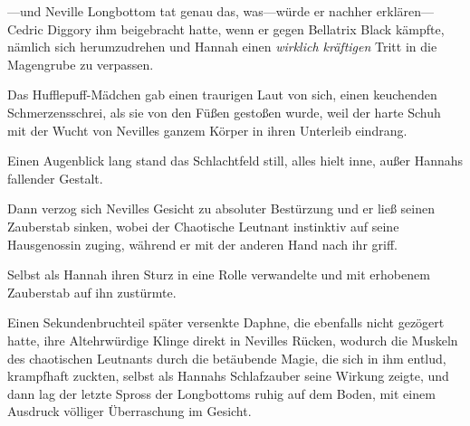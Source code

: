 —und Neville Longbottom tat genau das, was—würde er nachher erklären—Cedric Diggory ihm beigebracht hatte, wenn er gegen Bellatrix Black kämpfte, nämlich sich herumzudrehen und Hannah einen \emph{wirklich kräftigen} Tritt in die Magengrube zu verpassen.

Das Hufflepuff-Mädchen gab einen traurigen Laut von sich, einen keuchenden Schmerzensschrei, als sie von den Füßen gestoßen wurde, weil der harte Schuh mit der Wucht von Nevilles ganzem Körper in ihren Unterleib eindrang.

Einen Augenblick lang stand das Schlachtfeld still, alles hielt inne, außer Hannahs fallender Gestalt.

Dann verzog sich Nevilles Gesicht zu absoluter Bestürzung und er ließ seinen Zauberstab sinken, wobei der Chaotische Leutnant instinktiv auf seine Hausgenossin zuging, während er mit der anderen Hand nach ihr griff.

Selbst als Hannah ihren Sturz in eine Rolle verwandelte und mit erhobenem Zauberstab auf ihn zustürmte.

Einen Sekundenbruchteil später versenkte Daphne, die ebenfalls nicht gezögert hatte, ihre Altehrwürdige Klinge direkt in Nevilles Rücken, wodurch die Muskeln des chaotischen Leutnants durch die betäubende Magie, die sich in ihm entlud, krampfhaft zuckten, selbst als Hannahs Schlafzauber seine Wirkung zeigte, und dann lag der letzte Spross der Longbottoms ruhig auf dem Boden, mit einem Ausdruck völliger Überraschung im Gesicht.


